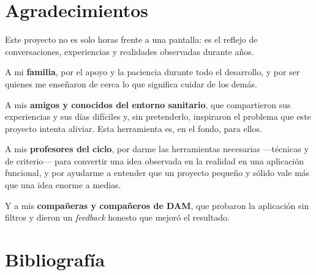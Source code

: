 \documentclass[12pt,a4paper]{report}
\begin{document}
\chapter*{Agradecimientos}

Este proyecto no es solo horas frente a una pantalla: es el reflejo de conversaciones, experiencias y realidades observadas durante años.

A mi \textbf{familia}, por el apoyo y la paciencia durante todo el desarrollo, y por ser quienes me enseñaron de cerca lo que significa cuidar de los demás.

A mis \textbf{amigos y conocidos del entorno sanitario}, que compartieron sus experiencias y sus días difíciles y, sin pretenderlo, inspiraron el problema que este proyecto intenta aliviar. Esta herramienta es, en el fondo, para ellos.

A mis \textbf{profesores del ciclo}, por darme las herramientas necesarias —técnicas y de criterio— para convertir una idea observada en la realidad en una aplicación funcional, y por ayudarme a entender que un proyecto pequeño y sólido vale más que una idea enorme a medias.

Y a mis \textbf{compañeras y compañeros de DAM}, que probaron la aplicación sin filtros y dieron un \emph{feedback} honesto que mejoró el resultado.

\chapter*{Bibliografía}
\end{document}
